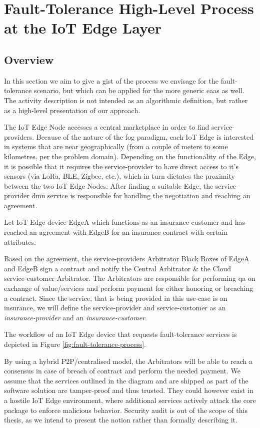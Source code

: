 \section{Fault-Tolerance High-Level Process at the IoT Edge Layer} \label{st:fault-tolerance}

\subsection{Overview}
In this section we aim to give a gist of the process we envisage for the fault-tolerance scenario, but which can be applied for the more generic \acrfull{eaas} as well. The activity description is not intended as an algorithmic definition, but rather as a high-level presentation of our approach. 

The IoT Edge Node accesses a central marketplace in order to find service-providers. Because of the nature of the fog paradigm, each IoT Edge is interested in systems that are near geographically (from a couple of meters to some kilometres, per the problem domain). Depending on the functionality of the Edge, it is possible that it requires the service-provider to have direct access to it’s sensors (via LoRa, BLE, Zigbee, etc.), which in turn dictates the proximity between the two IoT Edge Nodes. After finding a suitable Edge, the service-provider \acrshort{dmu} service is responsible for handling the negotiation and reaching an agreement.

Let IoT Edge device EdgeA which functions as an insurance customer and has reached an agreement with EdgeB for an insurance contract with certain attributes.
 
Based on the agreement, the service-providers Arbitrator Black Boxes of  EdgeA and EdgeB sign a contract and notify the Central Arbitrator \& the Cloud service-customer Arbitrator. The Arbitrators are responsible for performing \acrfull{qa} on exchange of value/services and perform payment for either honoring or breaching a contract. Since the service, that is being provided in this use-case is an insurance, we will define the service-provider and service-customer as an \textit{insurance-provider} and an \textit{insurance-customer}.

The workflow of an IoT Edge device that requests fault-tolerance services is depicted in Figure \ref{fig:fault-tolerance-process}.
 
By using a hybrid P2P/centralised model, the Arbitrators will be able to reach a consensus in case of breach of contract and perform the needed payment. We assume that the services outlined in the diagram and are shipped as part of the software solution are tamper-proof and thus trusted. They could however exist in a hostile  IoT Edge environment, where additional services actively attack the core package to enforce malicious behavior.  Security audit is out of the scope of this thesis, as we intend to present the notion rather than formally describing it.
 
